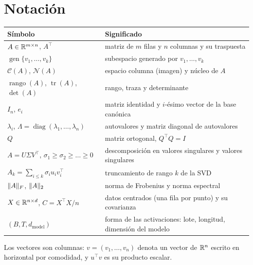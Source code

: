 \documentclass[11pt,a4paper,twoside,openany]{book}
\DeclareMathOperator{\rango}{rango}
\DeclareMathOperator{\traza}{tr}
\DeclareMathOperator{\gen}{gen}
\DeclareMathOperator{\diag}{diag}
\newcommand{\Col}{\mathcal{C}}
\newcommand{\Nuc}{\mathcal{N}}
\newcommand{\T}{^{\top}}
\newcommand{\dmodel}{d_{\mathrm{model}}}
\begin{document}
\section*{Notación}
\begin{center}
\small
\begin{tabular}{@{}ll@{}}
\toprule
Símbolo & Significado \\
\midrule
$A\in\mathbb{R}^{m\times n}$, $A\T$ & matriz de $m$ filas y $n$ columnas y su traspuesta \\
$\gen\{v_1,\dots,v_k\}$ & subespacio generado por $v_1,\dots,v_k$ \\
$\Col(A)$, $\Nuc(A)$ & espacio columna (imagen) y núcleo de $A$ \\
$\rango(A)$, $\traza(A)$, $\det(A)$ & rango, traza y determinante \\
$I_n$, $e_i$ & matriz identidad y $i$-ésimo vector de la base canónica \\
$\lambda_i$, $\Lambda=\diag(\lambda_1,\dots,\lambda_n)$ & autovalores y matriz diagonal de autovalores \\
$Q$ & matriz ortogonal, $Q\T Q=I$ \\
$A=U\Sigma V\T$, $\sigma_1\ge\sigma_2\ge\dots\ge 0$ & descomposición en valores singulares y valores singulares \\
$A_k=\sum_{i\le k}\sigma_i u_iv_i\T$ & truncamiento de rango $k$ de la SVD \\
$\lVert A\rVert_F$, $\lVert A\rVert_2$ & norma de Frobenius y norma espectral \\
$X\in\mathbb{R}^{n\times d}$, $C=X\T X/n$ & datos centrados (una fila por punto) y su covarianza \\
$(B,T,\dmodel)$ & forma de las activaciones: lote, longitud, dimensión del modelo \\
\bottomrule
\end{tabular}
\end{center}

Los vectores son columnas: $v=(v_1,\dots,v_n)$ denota un vector de $\mathbb{R}^{n}$ escrito en horizontal por comodidad, y $u\T v$ es su producto escalar.

\tableofcontents

\mainmatter







\appendix


\backmatter

\end{document}
